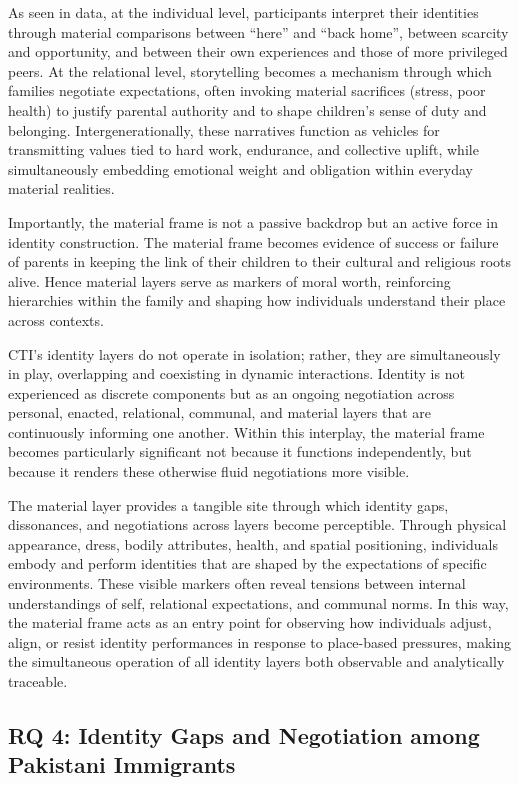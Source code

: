 As seen in data, at the individual level, participants interpret their identities through material comparisons between ``here'' and ``back home'', between scarcity and opportunity, and between their own experiences and those of more privileged peers. At the relational level, storytelling becomes a mechanism through which families negotiate expectations, often invoking material sacrifices (stress, poor health) to justify parental authority and to shape children’s sense of duty and belonging. Intergenerationally, these narratives function as vehicles for transmitting values tied to hard work, endurance, and collective uplift, while simultaneously embedding emotional weight and obligation within everyday material realities.

Importantly, the material frame is not a passive backdrop but an active force in identity construction. The material frame becomes evidence of success or failure of parents in keeping the link of their children to their cultural and religious roots alive. Hence material layers serve as markers of moral worth, reinforcing hierarchies within the family and shaping how individuals understand their place across contexts. 

CTI’s identity layers do not operate in isolation; rather, they are simultaneously in play, overlapping and coexisting in dynamic interactions. Identity is not experienced as discrete components but as an ongoing negotiation across personal, enacted, relational, communal, and material layers that are continuously informing one another. Within this interplay, the material frame becomes particularly significant not because it functions independently, but because it renders these otherwise fluid negotiations more visible.

The material layer provides a tangible site through which identity gaps, dissonances, and negotiations across layers become perceptible. Through physical appearance, dress, bodily attributes, health, and spatial positioning, individuals embody and perform identities that are shaped by the expectations of specific environments. These visible markers often reveal tensions between internal understandings of self, relational expectations, and communal norms. In this way, the material frame acts as an entry point for observing how individuals adjust, align, or resist identity performances in response to place-based pressures, making the simultaneous operation of all identity layers both observable and analytically traceable.

\subsection{RQ 4: Identity Gaps and Negotiation among Pakistani Immigrants}

